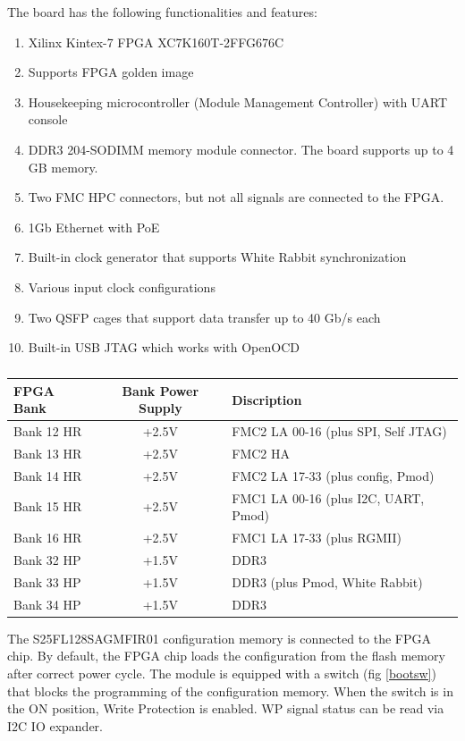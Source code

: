 \documentclass[12pt,oneside,a4]{article}
\begin{document}
The board has the following functionalities and features:
\begin{enumerate}
	\item Xilinx Kintex-7 FPGA XC7K160T-2FFG676C
	\item Supports FPGA golden image
	\item Housekeeping microcontroller (Module Management Controller) with UART console
	\item DDR3 204-SODIMM memory module connector. The board supports up to 4 GB memory.
	\item Two FMC HPC connectors, but not all signals are connected to the FPGA.
	\item 1Gb Ethernet with PoE
	\item Built-in clock generator that supports White Rabbit synchronization
	\item Various input clock configurations
	\item Two QSFP cages that support data transfer up to 40 Gb/s each
	\item Built-in USB JTAG which works with OpenOCD	
\end{enumerate}


\begin{table}[htbp]
\centering
\begin{tabular}{@{}lcl@{}}
\toprule
FPGA Bank  & Bank Power Supply & Discription \\ \midrule
Bank 12 HR & +2.5V             & FMC2 LA 00-16 (plus SPI, Self JTAG) \\
Bank 13 HR & +2.5V             & FMC2 HA\\
Bank 14 HR & +2.5V             & FMC2 LA 17-33 (plus config, Pmod)\\
Bank 15 HR & +2.5V             & FMC1 LA 00-16 (plus I2C, UART, Pmod)\\
Bank 16 HR & +2.5V             & FMC1 LA 17-33 (plus RGMII)\\
Bank 32 HP & +1.5V             & DDR3        \\
Bank 33 HP & +1.5V             & DDR3 (plus Pmod, White Rabbit) \\
Bank 34 HP & +1.5V             & DDR3       \\ \bottomrule
\end{tabular}
\caption{}
\label{tab:banks}
\end{table}

The S25FL128SAGMFIR01 configuration memory is connected to the FPGA chip. By default, the FPGA chip loads the configuration from the flash memory after correct power cycle. The module is equipped with a switch (fig \ref{bootsw}) that blocks the programming of the configuration memory. When the switch is in the ON position, Write Protection is enabled. WP signal status can be read via I2C IO expander.
\end{document}
